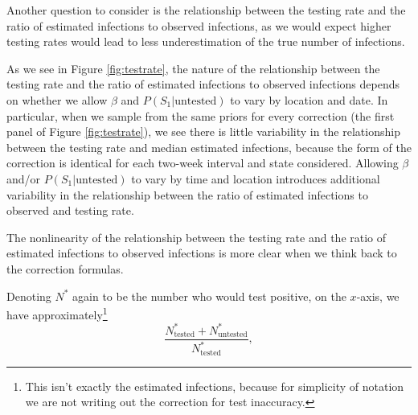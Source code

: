 \documentclass[12pt,twoside]{smiththesis}
\begin{document}
Another question to consider is the relationship between the testing rate and the ratio of estimated infections to observed infections, as we would expect higher testing rates would lead to less underestimation of the true number of infections.

As we see in Figure \ref{fig:testrate}, the nature of the relationship between the testing rate and the ratio of estimated infections to observed infections depends on whether we allow \(\beta\) and \(P(S_1|\text{untested})\) to vary by location and date. In particular, when we sample from the same priors for every correction (the first panel of Figure \ref{fig:testrate}), we see there is little variability in the relationship between the testing rate and median estimated infections, because the form of the correction is identical for each two-week interval and state considered. Allowing \(\beta\) and/or \(P(S_1|\text{untested})\) to vary by time and location introduces additional variability in the relationship between the ratio of estimated infections to observed and testing rate.

The nonlinearity of the relationship between the testing rate and the ratio of estimated infections to observed infections is more clear when we think back to the correction formulas.

Denoting \(N^*\) again to be the number who would test positive, on the \(x\)-axis, we have approximately\footnote{This isn't exactly the estimated infections, because for simplicity of notation we are not writing out the correction for test inaccuracy.}
\[\frac{N^*_{\text{tested}} + N^*_{\text{untested}}}{N^*_{\text{tested}}},\]
\end{document}
